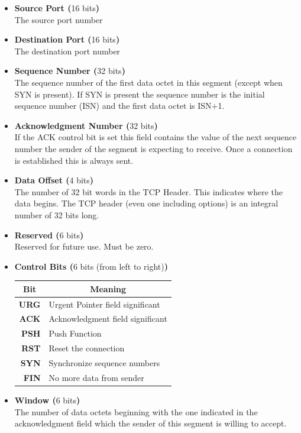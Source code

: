 \begin{itemize}
\item{\textbf{Source Port (}16 bits\textbf{)}\\
The source port number}
\item{\textbf{Destination Port (}16 bits\textbf{)}\\
The destination port number}
\item{\textbf{Sequence Number (}32 bits\textbf{)}\\
The sequence number of the first data octet in this segment (except when SYN is present). If SYN is present the sequence number is the initial sequence number (ISN) and the first data octet is ISN+1.}
\item{\textbf{Acknowledgment Number (}32 bits\textbf{)}\\
If the ACK control bit is set this field contains the value of the next sequence number the sender of the segment is expecting to receive. Once a connection is established this is always sent.}
\item{\textbf{Data Offset (}4 bits\textbf{)}\\
The number of 32 bit words in the TCP Header.  This indicates where the data begins.  The TCP header (even one including options) is an integral number of 32 bits long.}
\item{\textbf{Reserved (}6 bits\textbf{)}\\
Reserved for future use.  Must be zero.}
\item{\textbf{Control Bits  (}6 bits (from left to right)\textbf{)}\\
\begin{table}[h]
\centering\footnotesize
\begin{tabular}{rl}
\multicolumn{1}{c}{\textbf{Bit}} & \multicolumn{1}{c}{\textbf{Meaning}}\\
\hline
\textbf{URG} & Urgent Pointer field significant\\
\textbf{ACK} & Acknowledgment field significant\\
\textbf{PSH} & Push Function\\
\textbf{RST} & Reset the connection\\
\textbf{SYN} & Synchronize sequence numbers\\
\textbf{FIN} & No more data from sender
\end{tabular}
\end{table}
}
\item{\textbf{Window (}6 bits\textbf{)}\\
The number of data octets beginning with the one indicated in the acknowledgment field which the sender of this segment is willing to accept.}

\end{itemize}
